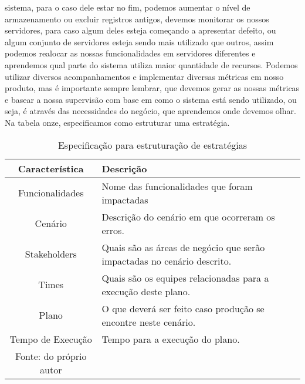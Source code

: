       sistema, para o caso dele estar no fim, podemos aumentar o nível de armazenamento
      ou excluir registros antigos, devemos monitorar os nossos servidores, para
      caso algum deles esteja começando a apresentar defeito, ou algum conjunto
      de servidores esteja sendo mais utilizado que outros, assim podemos realocar
      as nossas funcionalidades em servidores diferentes e aprendemos qual parte
      do sistema utiliza maior quantidade de recursos. Podemos utilizar diversos
      acompanhamentos e implementar diversas métricas em nosso produto, mas é
      importante sempre lembrar, que devemos gerar as nossas métricas e basear a
      nossa supervisão com base em como o sistema está sendo utilizado, ou seja,
      é através das necessidades do negócio, que aprendemos onde devemos olhar.
      Na tabela onze, especificamos como estruturar uma estratégia.\newline

      \begin{table}[h!]
        \centering
        \label{Tabela:11}
        \caption{Especificação para estruturação de estratégias}
        \begin{tabular}{c p{9cm}}
          \hline
          \textbf{Característica} &
          \textbf{Descrição} \\
          \hline
          Funcionalidades &
          Nome das funcionalidades que foram impactadas \\
          Cenário &
          Descrição do cenário em que ocorreram os erros. \\
          Stakeholders &
          Quais são as áreas de negócio que serão impactadas no cenário descrito. \\
          Times &
          Quais são os equipes relacionadas para a execução deste plano. \\
          Plano &
          O que deverá ser feito caso produção se encontre neste cenário. \\
          Tempo de Execução &
          Tempo para a execução do plano. \\ \hline
          \newline
          \small{Fonte: do próprio autor}
        \end{tabular}
      \end{table}

